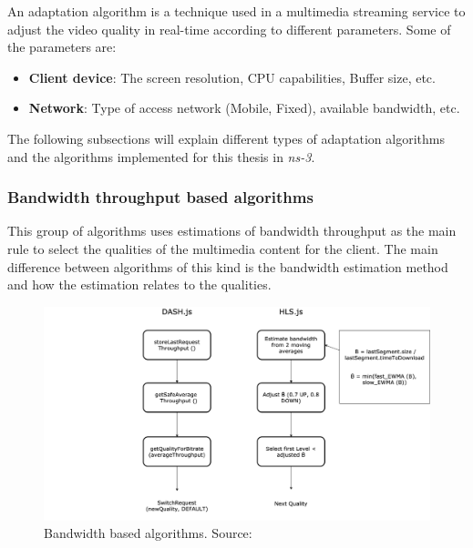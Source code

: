An adaptation algorithm is a technique used in a multimedia streaming service to adjust the video quality
in real-time according to different parameters. Some of the parameters are:

\begin{itemize}[noitemsep,topsep=0pt]
  \item \textbf{Client device}: The screen resolution, CPU capabilities, Buffer size, etc.
  \item \textbf{Network}: Type of access network (Mobile, Fixed), available bandwidth, etc.
\end{itemize}

The following subsections will explain different types of adaptation algorithms and the algorithms implemented
for this thesis in \textit{ns-3}.

\subsubsection{Bandwidth throughput based algorithms}

This group of algorithms uses estimations of bandwidth throughput as the main rule to select
the qualities of the multimedia content for the client. The main difference between algorithms of
this kind is the bandwidth estimation method and how the estimation relates to the qualities. 

\begin{figure}[h]
  \centering
  \includegraphics[width=\textwidth]{img/dashjs.png}
  \caption{Bandwidth based algorithms. Source: \cite{abr1}}
  \label{fig:throughput}
\end{figure}

